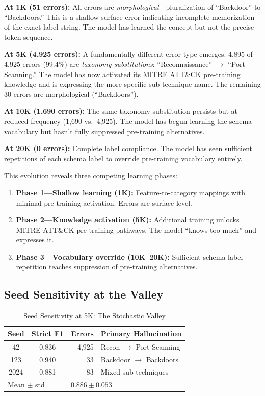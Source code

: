 \documentclass[review,3p]{elsarticle}
\begin{document}
\textbf{At 1K (51 errors):} All errors are \emph{morphological}---pluralization of ``Backdoor'' to ``Backdoors.'' This is a shallow surface error indicating incomplete memorization of the exact label string. The model has learned the concept but not the precise token sequence.

\textbf{At 5K (4,925 errors):} A fundamentally different error type emerges. 4,895 of 4,925 errors (99.4\%) are \emph{taxonomy substitutions}: ``Reconnaissance'' $\to$ ``Port Scanning.'' The model has now activated its MITRE ATT\&CK pre-training knowledge and is expressing the more specific sub-technique name. The remaining 30 errors are morphological (``Backdoors'').

\textbf{At 10K (1,690 errors):} The same taxonomy substitution persists but at reduced frequency (1,690 vs.\ 4,925). The model has begun learning the schema vocabulary but hasn't fully suppressed pre-training alternatives.

\textbf{At 20K (0 errors):} Complete label compliance. The model has seen sufficient repetitions of each schema label to override pre-training vocabulary entirely.

This evolution reveals three competing learning phases:
\begin{enumerate}
\item \textbf{Phase 1---Shallow learning (1K):} Feature-to-category mappings with minimal pre-training activation. Errors are surface-level.
\item \textbf{Phase 2---Knowledge activation (5K):} Additional training unlocks MITRE ATT\&CK pre-training pathways. The model ``knows too much'' and expresses it.
\item \textbf{Phase 3---Vocabulary override (10K--20K):} Sufficient schema label repetition teaches suppression of pre-training alternatives.
\end{enumerate}

\subsection{Seed Sensitivity at the Valley}

\begin{table}[!ht]
\centering
\caption{Seed Sensitivity at 5K: The Stochastic Valley}
\label{tab:seed}
\begin{tabular}{ccrl}
\toprule
\textbf{Seed} & \textbf{Strict F1} & \textbf{Errors} & \textbf{Primary Hallucination} \\
\midrule
42 & 0.836 & 4,925 & Recon $\to$ Port Scanning \\
123 & 0.940 & 33 & Backdoor $\to$ Backdoors \\
2024 & 0.881 & 83 & Mixed sub-techniques \\
\midrule
\multicolumn{2}{l}{Mean $\pm$ std} & \multicolumn{2}{l}{$0.886 \pm 0.053$} \\
\bottomrule
\end{tabular}
\end{table}
\end{document}
